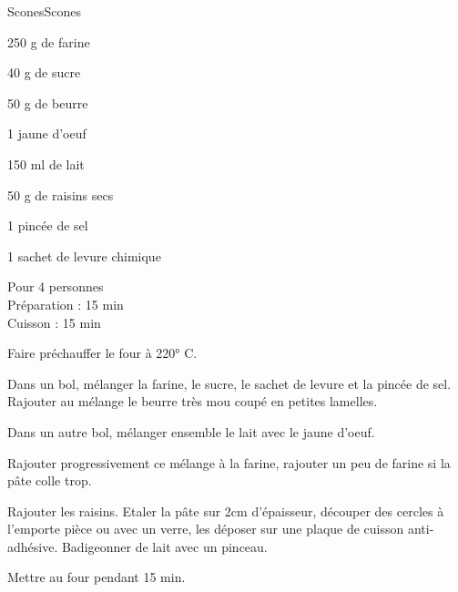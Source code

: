 \begin{recette}{Scones}{Scones}

\begin{ingredients}
250 g de farine\par
40 g de sucre\par
50 g de beurre\par
1 jaune d'oeuf\par
150 ml de lait\par
50 g de raisins secs\par
1 pincée de sel\par
1 sachet de levure chimique\par
\end{ingredients}

\begin{infos}
Pour 4 personnes\\
Préparation : 15 min\\
Cuisson : 15 min\\
\end{infos}

\begin{etapes}
\item Faire préchauffer le four à 220° C.
\item Dans un bol, mélanger la farine, le sucre, le sachet de levure et la pincée de sel. Rajouter au mélange le beurre très mou coupé en petites lamelles.
\item Dans un autre bol, mélanger ensemble le lait avec le jaune d'oeuf.
\item Rajouter progressivement ce mélange à la farine, rajouter un peu de farine si la pâte colle trop.
\item Rajouter les raisins. Etaler la pâte sur 2cm d'épaisseur, découper des cercles à l'emporte pièce ou avec un verre, les déposer sur une plaque de cuisson anti-adhésive. Badigeonner de lait avec un pinceau.
\item Mettre au four pendant 15 min.
\end{etapes}

\end{recette}